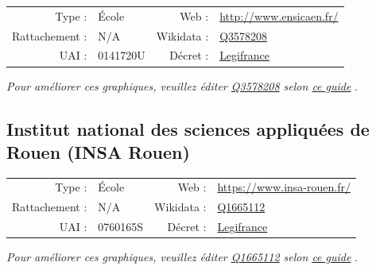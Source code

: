 \documentclass[11pt,french,landscape]{article}
\begin{document}
\begin{tabular*}{0.45\textwidth}{rp{2cm}rl}  
\hline  
Type : & École & Web : &\href{http://www.ensicaen.fr/}{http://www.ensicaen.fr/} \\  
Rattachement : & N/A & Wikidata : & \href{https://www.wikidata.org/entity/Q3578208}{Q3578208} \\  
UAI : & 0141720U & Décret : & \href{http://www.legifrance.gouv.fr/affichTexte.do;jsessionid=4CDB3AA29A7C409BB10ADEC6C3F60536.tpdila11v_2?cidTexte=JORFTEXT000031056872&dateTexte=&oldAction=rechJO&categorieLien=id&idJO=JORFCONT000031056523}{Legifrance} \\  
\hline  
\end{tabular*}

\textit{\scriptsize Pour améliorer ces graphiques, veuillez éditer \href{https://www.wikidata.org/entity/Q3578208}{Q3578208}  selon \href{https://github.com/cpesr/wikidataESR/blob/master/Rmd/wikidataESR.md}{ce guide}}
.


\newpage

\hypertarget{institut-national-des-sciences-appliquuxe9es-de-rouen-insa-rouen}{%
\subsection{Institut national des sciences appliquées de Rouen (INSA
Rouen)}\label{institut-national-des-sciences-appliquuxe9es-de-rouen-insa-rouen}}

\begin{tabular*}{0.45\textwidth}{rp{2cm}rl}  
\hline  
Type : & École & Web : &\href{https://www.insa-rouen.fr/}{https://www.insa-rouen.fr/} \\  
Rattachement : & N/A & Wikidata : & \href{https://www.wikidata.org/entity/Q1665112}{Q1665112} \\  
UAI : & 0760165S & Décret : & \href{Abrogé}{Legifrance} \\  
\hline  
\end{tabular*}

\textit{\scriptsize Pour améliorer ces graphiques, veuillez éditer \href{https://www.wikidata.org/entity/Q1665112}{Q1665112}  selon \href{https://github.com/cpesr/wikidataESR/blob/master/Rmd/wikidataESR.md}{ce guide}}
.

\end{document}
